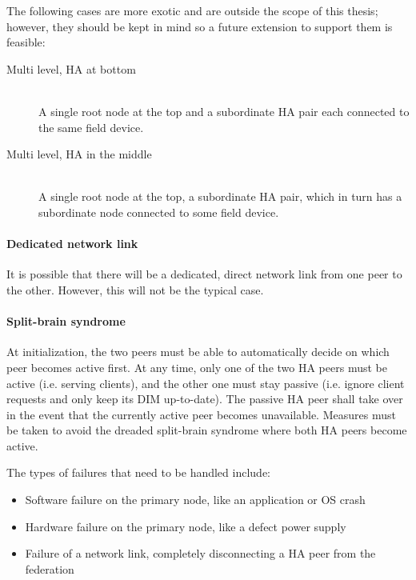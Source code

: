 The following cases are more exotic and are outside the scope of this thesis;
however, they should be kept in mind so a future extension to support them is
feasible:

\begin{description}
	\item [ Multi level, \gls{HA} at bottom ] \hfill\\
	A single root node at the top and a subordinate HA pair each connected
	to the same field device.

	\item [ Multi level, \gls{HA} in the middle ] \hfill\\
	A single root node at the top, a subordinate HA pair, which in turn has
	a subordinate node connected to some field device.
\end{description}


\paragraph{Dedicated network link}
It is possible that there will be a dedicated, direct network link from one peer to
the other. However, this will not be the typical case.

\paragraph{Split-brain syndrome}
At initialization, the two peers must be able to automatically decide on which peer
becomes active first.  At any time, only one of the two HA peers must be
active (i.e. serving clients), and the other one must stay passive (i.e. ignore
client requests and only keep its DIM up-to-date). The passive HA peer shall
take over in the event that the currently active peer becomes unavailable.
Measures must be taken to avoid the dreaded split-brain syndrome where both HA
peers become active.

The types of failures that need to be handled include:
\begin{itemize}
	\item Software failure on the primary node, like an application or OS crash
	\item Hardware failure on the primary node, like a defect power supply
	\item Failure of a network link, completely disconnecting a HA peer from the federation
\end{itemize}

